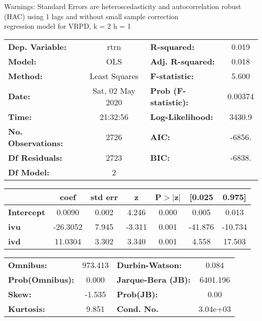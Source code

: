 Warnings: \newline
 [1] Standard Errors are heteroscedasticity and autocorrelation robust (HAC) using 1 lags and without small sample correction\\ 

regression model for VRPD, k = 2 h = 1\begin{center}
\begin{tabular}{lclc}
\toprule
\textbf{Dep. Variable:}    &       rtrn       & \textbf{  R-squared:         } &     0.019   \\
\textbf{Model:}            &       OLS        & \textbf{  Adj. R-squared:    } &     0.018   \\
\textbf{Method:}           &  Least Squares   & \textbf{  F-statistic:       } &     5.600   \\
\textbf{Date:}             & Sat, 02 May 2020 & \textbf{  Prob (F-statistic):} &  0.00374    \\
\textbf{Time:}             &     21:32:56     & \textbf{  Log-Likelihood:    } &    3430.9   \\
\textbf{No. Observations:} &        2726      & \textbf{  AIC:               } &    -6856.   \\
\textbf{Df Residuals:}     &        2723      & \textbf{  BIC:               } &    -6838.   \\
\textbf{Df Model:}         &           2      & \textbf{                     } &             \\
\bottomrule
\end{tabular}
\begin{tabular}{lcccccc}
                   & \textbf{coef} & \textbf{std err} & \textbf{z} & \textbf{P$> |$z$|$} & \textbf{[0.025} & \textbf{0.975]}  \\
\midrule
\textbf{Intercept} &       0.0090  &        0.002     &     4.246  &         0.000        &        0.005    &        0.013     \\
\textbf{ivu}       &     -26.3052  &        7.945     &    -3.311  &         0.001        &      -41.876    &      -10.734     \\
\textbf{ivd}       &      11.0304  &        3.302     &     3.340  &         0.001        &        4.558    &       17.503     \\
\bottomrule
\end{tabular}
\begin{tabular}{lclc}
\textbf{Omnibus:}       & 973.413 & \textbf{  Durbin-Watson:     } &    0.084  \\
\textbf{Prob(Omnibus):} &   0.000 & \textbf{  Jarque-Bera (JB):  } & 6401.196  \\
\textbf{Skew:}          &  -1.535 & \textbf{  Prob(JB):          } &     0.00  \\
\textbf{Kurtosis:}      &   9.851 & \textbf{  Cond. No.          } & 3.04e+03  \\
\bottomrule
\end{tabular}
\end{center}

